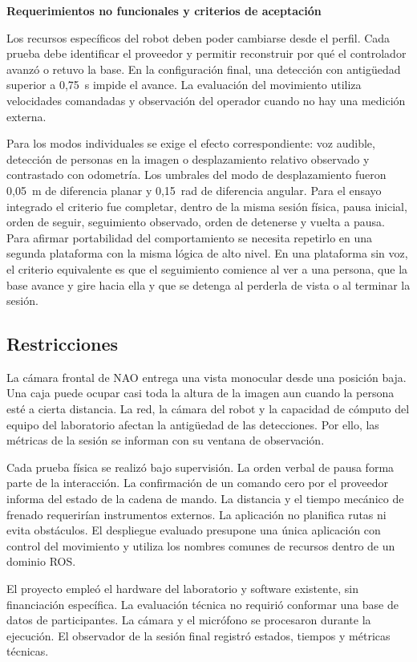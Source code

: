 \documentclass[11pt,letterpaper]{article}
\begin{document}
\par\medskip\noindent\textbf{Requerimientos no funcionales y criterios de aceptación}\par
Los recursos específicos del robot deben poder cambiarse desde el perfil. Cada prueba debe identificar el proveedor y permitir reconstruir por qué el controlador avanzó o retuvo la base. En la configuración final, una detección con antigüedad superior a 0,75~s impide el avance. La evaluación del movimiento utiliza velocidades comandadas y observación del operador cuando no hay una medición externa.

Para los modos individuales se exige el efecto correspondiente: voz audible, detección de personas en la imagen o desplazamiento relativo observado y contrastado con odometría. Los umbrales del modo de desplazamiento fueron 0,05~m de diferencia planar y 0,15~rad de diferencia angular. Para el ensayo integrado el criterio fue completar, dentro de la misma sesión física, pausa inicial, orden de seguir, seguimiento observado, orden de detenerse y vuelta a pausa. Para afirmar portabilidad del comportamiento se necesita repetirlo en una segunda plataforma con la misma lógica de alto nivel. En una plataforma sin voz, el criterio equivalente es que el seguimiento comience al ver a una persona, que la base avance y gire hacia ella y que se detenga al perderla de vista o al terminar la sesión.

\subsection{Restricciones}
La cámara frontal de NAO entrega una vista monocular desde una posición baja. Una caja puede ocupar casi toda la altura de la imagen aun cuando la persona esté a cierta distancia. La red, la cámara del robot y la capacidad de cómputo del equipo del laboratorio afectan la antigüedad de las detecciones. Por ello, las métricas de la sesión se informan con su ventana de observación.

Cada prueba física se realizó bajo supervisión. La orden verbal de pausa forma parte de la interacción. La confirmación de un comando cero por el proveedor informa del estado de la cadena de mando. La distancia y el tiempo mecánico de frenado requerirían instrumentos externos. La aplicación no planifica rutas ni evita obstáculos. El despliegue evaluado presupone una única aplicación con control del movimiento y utiliza los nombres comunes de recursos dentro de un dominio ROS.

El proyecto empleó el hardware del laboratorio y software existente, sin financiación específica. La evaluación técnica no requirió conformar una base de datos de participantes. La cámara y el micrófono se procesaron durante la ejecución. El observador de la sesión final registró estados, tiempos y métricas técnicas.
\end{document}
